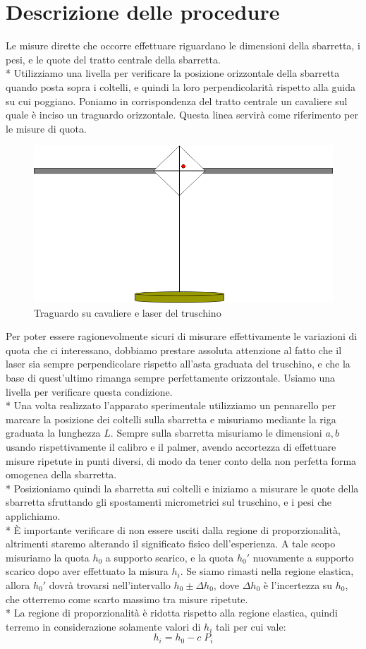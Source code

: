 \documentclass[10pt,a4paper]{book}
\begin{document}
\section*{Descrizione delle procedure}
Le misure dirette che occorre effettuare riguardano le dimensioni della sbarretta, i pesi, e le quote del tratto centrale della sbarretta.\\*
Utilizziamo una livella per verificare la posizione orizzontale della sbarretta quando posta sopra i coltelli, e quindi la loro perpendicolarità rispetto alla guida su cui poggiano. Poniamo in corrispondenza del tratto centrale un cavaliere sul quale è inciso un traguardo orizzontale. Questa linea servirà come riferimento per le misure di quota.
\begin{figure}[h]
	\centering
	\includegraphics[width=0.7\linewidth]{cavaliere}
	\caption{Traguardo su cavaliere e laser del truschino}
	\label{fig:cavaliere}
\end{figure}
Per poter essere ragionevolmente sicuri di misurare effettivamente le variazioni di quota che ci interessano, dobbiamo prestare assoluta attenzione al fatto che il laser sia sempre perpendicolare rispetto all'asta graduata del truschino, e che la base di quest'ultimo rimanga sempre perfettamente orizzontale. Usiamo una livella per verificare questa condizione.\\*
Una volta realizzato l'apparato sperimentale utilizziamo un pennarello per marcare la posizione dei coltelli sulla sbarretta e misuriamo mediante la riga graduata la lunghezza $L$. Sempre sulla sbarretta misuriamo le dimensioni $a,b$ usando rispettivamente il calibro e il palmer, avendo accortezza di effettuare misure ripetute in punti diversi, di modo da tener conto della non perfetta forma omogenea della sbarretta.\\*
Posizioniamo quindi la sbarretta sui coltelli e iniziamo a misurare le quote della sbarretta sfruttando gli spostamenti micrometrici sul truschino, e i pesi che applichiamo.\\*
È importante verificare di non essere usciti dalla regione di proporzionalità, altrimenti staremo alterando il significato fisico dell'esperienza. A tale scopo misuriamo la quota $h_0$ a supporto scarico, e la quota $h_0'$ nuovamente a supporto scarico dopo aver effettuato la misura $h_i$. Se siamo rimasti nella regione elastica, allora $h_0'$ dovrà trovarsi nell'intervallo $h_0 \pm \Delta h_0$, dove $\Delta h_0$ è l'incertezza su $h_0$, che otterremo come scarto massimo tra misure ripetute.\\*
La regione di proporzionalità è ridotta rispetto alla regione elastica, quindi terremo in considerazione solamente valori di $h_i$ tali per cui vale:
$$
h_i = h_0 - c\;P_i
$$
\end{document}
